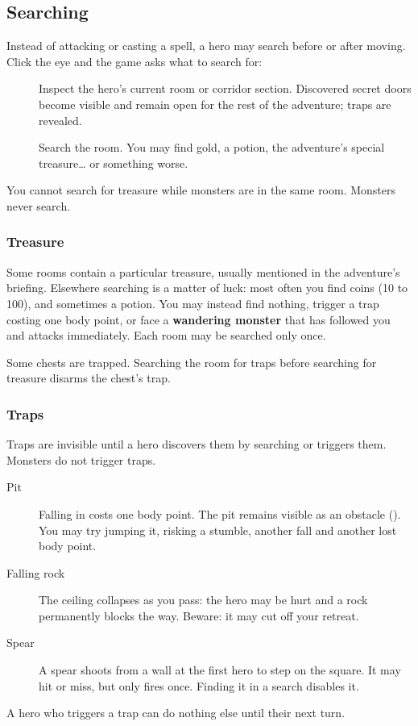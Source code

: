 \subsection{Searching}
Instead of attacking or casting a spell, a hero may search before or after moving. Click the eye and the game asks what to search for:
\begin{description}
\item[] Inspect the hero's current room or corridor section. Discovered secret doors become visible and remain open for the rest of the adventure; traps are revealed.
\item[] Search the room. You may find gold, a potion, the adventure's special treasure\ldots{} or something worse.
\end{description}
You cannot search for treasure while monsters are in the same room. Monsters never search.
\subsubsection*{Treasure}
Some rooms contain a particular treasure, usually mentioned in the adventure's briefing. Elsewhere searching is a matter of luck: most often you find coins (10 to 100), and sometimes a potion. You may instead find nothing, trigger a trap costing one body point, or face a \textbf{wandering monster} that has followed you and attacks immediately. Each room may be searched only once.

Some chests are trapped. Searching the room for traps before searching for treasure disarms the chest's trap.
\subsubsection*{Traps}
Traps are invisible until a hero discovers them by searching or triggers them. Monsters do not trigger traps.
\begin{description}
\item[Pit] Falling in costs one body point. The pit remains visible as an obstacle (). You may try jumping it, risking a stumble, another fall and another lost body point.
\item[Falling rock] The ceiling collapses as you pass: the hero may be hurt and a rock permanently blocks the way. Beware: it may cut off your retreat.
\item[Spear] A spear shoots from a wall at the first hero to step on the square. It may hit or miss, but only fires once. Finding it in a search disables it.
\end{description}
A hero who triggers a trap can do nothing else until their next turn.

